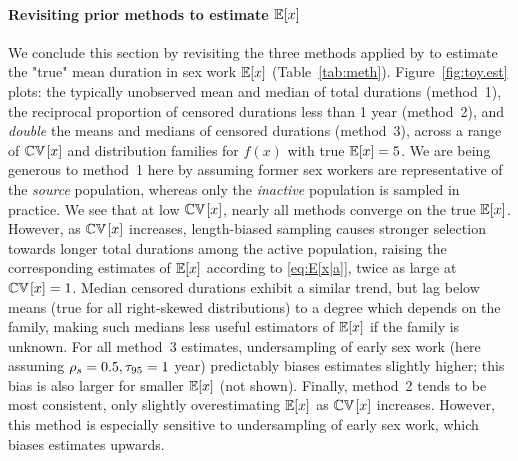 \paragraph{Revisiting prior methods to estimate $\mathbb{E}[x]$}
We conclude this section by revisiting
the three methods applied by \citet{Fazito2012}
to estimate the "true" mean duration in sex work $\mathbb{E}[x]$ (Table~\ref{tab:meth}).
Figure~\ref{fig:toy.est} plots:
the typically unobserved mean and median of total durations (method~1),%
the reciprocal proportion of censored durations less than 1 year (method~2),
and \emph{double} the means and medians of censored durations (method~3),
across a range of $\mathbb{CV}\hskip1pt[x]$ and distribution families for $f(x)$ with true $\mathbb{E}[x] = 5$.
We are being generous to method~1 here by assuming
former sex workers are representative of the \emph{source} population,
whereas only the \emph{inactive} population is sampled in practice.
We see that at low $\mathbb{CV}\hskip1pt[x]$, nearly all methods converge on the true $\mathbb{E}[x]$.
However, as $\mathbb{CV}\hskip1pt[x]$ increases,
length-biased sampling causes stronger selection towards
longer total durations among the active population,
raising the corresponding estimates of $\mathbb{E}[x]$ according to \eqref{eq:E[x|a]},
\eg twice as large at $\mathbb{CV}\hskip1pt[x] = 1$.
Median censored durations exhibit a similar trend,
but lag below means (true for all right-skewed distributions)
to a degree which depends on the family,
making such medians less useful estimators of $\mathbb{E}[x]$ if the family is unknown.
For all method~3 estimates, undersampling of early sex work
(here assuming $\rho_s = 0.5, \tau_{95} = 1$ year)
predictably biases estimates slightly higher;
this bias is also larger for smaller $\mathbb{E}[x]$ (not shown).
Finally, method~2 tends to be most consistent,
only slightly overestimating $\mathbb{E}[x]$ as $\mathbb{CV}\hskip1pt[x]$ increases.
However, this method is especially sensitive to
undersampling of early sex work, which biases estimates upwards.
